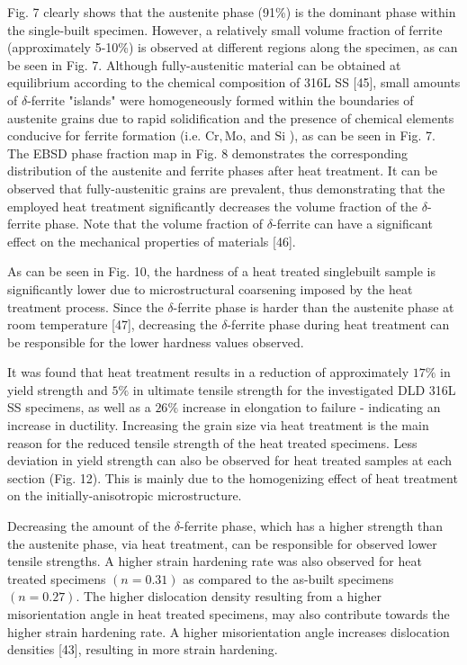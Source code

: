 \documentclass[10pt]{article}
\begin{document}
Fig. 7 clearly shows that the austenite phase (91\%) is the dominant phase within the single-built specimen. However, a relatively small volume fraction of ferrite (approximately 5-10\%) is observed at different regions along the specimen, as can be seen in Fig. 7. Although fully-austenitic material can be obtained at equilibrium according to the chemical composition of 316L SS [45], small amounts of $\delta$-ferrite "islands" were homogeneously formed within the boundaries of austenite grains due to rapid solidification and the presence of chemical elements conducive for ferrite formation (i.e. $\mathrm{Cr}, \mathrm{Mo}$, and $\mathrm{Si}$ ), as can be seen in Fig. 7. The EBSD phase fraction map in Fig. 8 demonstrates the corresponding distribution of the austenite and ferrite phases after heat treatment. It can be observed that fully-austenitic grains are prevalent, thus demonstrating that the employed heat treatment significantly decreases the volume fraction of the $\delta$-ferrite phase. Note that the volume fraction of $\delta$-ferrite can have a significant effect on the mechanical properties of materials [46].

As can be seen in Fig. 10, the hardness of a heat treated singlebuilt sample is significantly lower due to microstructural coarsening imposed by the heat treatment process. Since the $\delta$-ferrite phase is harder than the austenite phase at room temperature [47], decreasing the $\delta$-ferrite phase during heat treatment can be responsible for the lower hardness values observed.

It was found that heat treatment results in a reduction of approximately $17 \%$ in yield strength and $5 \%$ in ultimate tensile strength for the investigated DLD 316L SS specimens, as well as a $26 \%$ increase in elongation to failure - indicating an increase in ductility. Increasing the grain size via heat treatment is the main reason for the reduced tensile strength of the heat treated specimens. Less deviation in yield strength can also be observed for heat treated samples at each section (Fig. 12). This is mainly due to the homogenizing effect of heat treatment on the initially-anisotropic microstructure.

Decreasing the amount of the $\delta$-ferrite phase, which has a higher strength than the austenite phase, via heat treatment, can be responsible for observed lower tensile strengths. A higher strain hardening rate was also observed for heat treated specimens $(n=0.31)$ as compared to the as-built specimens $(n=0.27)$. The higher dislocation density resulting from a higher misorientation angle in heat treated specimens, may also contribute towards the higher strain hardening rate. A higher misorientation angle increases dislocation densities [43], resulting in more strain hardening.
\end{document}
